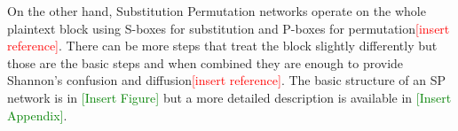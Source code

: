 \documentclass[12pt,twoside,a4paper]{report}
\begin{document}
    
    On the other hand, Substitution Permutation networks operate on the whole plaintext block using S-boxes for substitution and P-boxes for permutation\textcolor{red}{[insert reference]}. There can be more steps that treat the block slightly differently but those are the basic steps and when combined they are enough to provide Shannon's confusion and diffusion\textcolor{red}{[insert reference]}. The basic structure of an SP network is in \textcolor{green}{[Insert Figure]} but a more detailed description is available in \textcolor{green}{[Insert Appendix]}.
    
    
    
\end{document}
